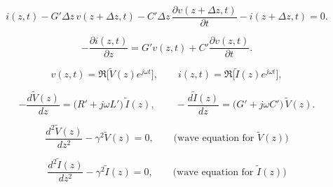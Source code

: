 	\begin{equation}
i(z,t) - G' \Delta z \, v(z+\Delta z, t) 
- C' \Delta z \, \frac{\partial v(z+\Delta z, t)}{\partial t} 
- i(z+\Delta z, t) = 0.
	\end{equation}
	
	\begin{equation}
- \frac{\partial i(z,t)}{\partial z} 
= G' v(z,t) + C' \frac{\partial v(z,t)}{\partial t}.
	\end{equation}
	
	\begin{equation}
v(z,t) = \Re \big[ \tilde{V}(z) e^{j\omega t} \big], \qquad
i(z,t) = \Re \big[ \tilde{I}(z) e^{j\omega t} \big],
	\end{equation}

	\begin{equation}
- \frac{d \tilde{V}(z)}{dz} = \big(R' + j \omega L'\big)\, \tilde{I}(z),
\qquad
- \frac{d \tilde{I}(z)}{dz} = \big(G' + j \omega C'\big)\, \tilde{V}(z).
	\end{equation}

	\begin{equation}
\frac{d^{2} \tilde{V}(z)}{dz^{2}} - \gamma^{2} \tilde{V}(z) = 0,
\qquad \text{(wave equation for $\tilde{V}(z)$)} 
	\end{equation}
	
	\begin{equation}
\frac{d^{2} \tilde{I}(z)}{dz^{2}} - \gamma^{2} \tilde{I}(z) = 0,
\qquad \text{(wave equation for $\tilde{I}(z)$)}
	\end{equation}
	
